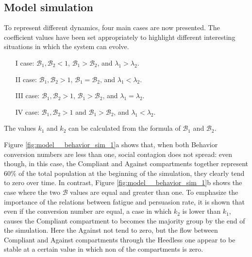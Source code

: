 \subsection{Model simulation}
To represent different dynamics, four main cases are now presented. The coefficient values have been set appropriately to highlight different interesting situations in which the system can evolve.

\begin{itemize}
	\item[I] case: $\mathcal{B}_1, \mathcal{B}_2 <1$, $\mathcal{B}_1 >  \mathcal{B}_2$, and $\lambda_1 > \lambda_2$.
	\item[II] case: $\mathcal{B}_1, \mathcal{B}_2 >1$, $\mathcal{B}_1 =  \mathcal{B}_2$, and $\lambda_1 < \lambda_2$.
	\item[III] case: $\mathcal{B}_1, \mathcal{B}_2 >1$, $\mathcal{B}_1 >  \mathcal{B}_2$, and $\lambda_1 = \lambda_2$.
	\item[IV] case: $\mathcal{B}_1, \mathcal{B}_2 >1$ and $\mathcal{B}_1 >  \mathcal{B}_2$, and $\lambda_1 < \lambda_2$.
\end{itemize}

The values $k_1$ and $k_2$ can be calculated from the formula of $\mathcal{B}_1$ and $\mathcal{B}_2$.

Figure \ref{fig:model__behavior_sim_1}a shows that, when both Behavior conversion numbers are less than one, social contagion does not spread: even though, in this case, the Compliant and Against compartments together represent $60\%$ of the total population at the beginning of the simulation, they clearly tend to zero over time. In contrast, Figure \ref{fig:model__behavior_sim_1}b shows the case where the two $\mathcal{B}$ values are equal and greater than one. To emphasize the importance of the relations between fatigue and persuasion rate, it is shown that even if the conversion number are equal, a case in which $k_2$  is lower than $k_1$, causes the Compliant compartment to becomes the majority group by the end of the simulation. Here the Against not tend to zero, but the flow between Compliant and Against compartments through the Heedless one appear to be stable at a certain value in which non of the compartments is zero. 


